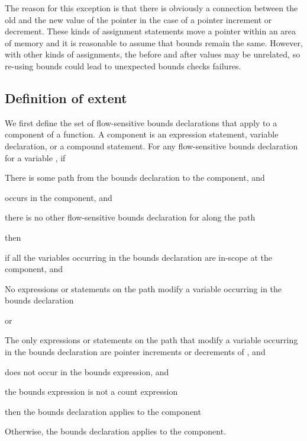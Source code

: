 The reason for this exception is that there is obviously a connection
between the old and the new value of the pointer in the case of a
pointer increment or decrement. These kinds of assignment statements
move a pointer within an area of memory and it is reasonable to assume
that bounds remain the same. However, with other kinds of assignments,
the before and after values may be unrelated, so re-using bounds could
lead to unexpected bounds checks failures.

\subsection{Definition of extent}
\label{section:extent-definition}

We first define the set of flow-sensitive bounds declarations that apply to a
component of a function.  A component is an expression statement,
variable declaration, or a compound statement. For any flow-sensitive bounds
declaration for a variable , if

\begin{compactenum}
\item
  There is some path from the bounds declaration to the
  component, and
\item
   occurs in the component, and
\item
  there is no other flow-sensitive bounds declaration for
   along the path
\end{compactenum}

then

\begin{compactenum}
\item
  if all the variables occurring in the bounds declaration are
  in-scope at the component, and
  \begin{compactenum}
  \item No expressions or statements on the path modify a variable
  occurring in the bounds declaration
  \item or
  \begin{compactenum}
  \item The only expressions or statements on the path that
   modify a variable occurring in the bounds declaration
   are pointer increments or decrements of , and
   \item {} does not occur in the bounds expression, and
   \item the bounds expression is not a count expression
   \end{compactenum}
   \end{compactenum}
   then the bounds declaration applies to the component
\item
   Otherwise, the bounds declaration 
   applies to the component.
\end{compactenum}

